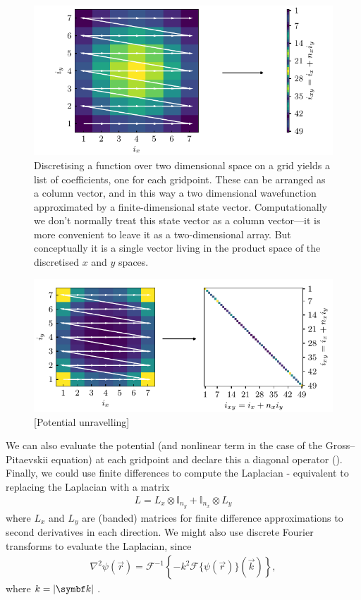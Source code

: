 \begin{figure}[t]
    \centerfloat
    \includegraphics[width=\textwidth]{figures/numerics/vector_unravel.pdf}
    \caption{Discretising a function over two dimensional space on a grid yields a list of coefficients, one for each gridpoint. These can be arranged as a column vector, and in this way a two dimensional wavefunction approximated by a finite-dimensional state vector. Computationally we don't normally treat this state vector as a column vector---it is more convenient to leave it as a two-dimensional array. But conceptually it is a single vector living in the product space of the discretised $x$ and $y$ spaces.}
    \label{fig:vector_unravel}
\end{figure}

\begin{figure}[t]
    \centerfloat
    \includegraphics[width=\textwidth]{figures/numerics/potential_unravel.pdf}
    \caption{[Potential unravelling]}
    \label{fig:potential_unravel}
\end{figure}

We can also evaluate the potential (and nonlinear term in the case of the Gross--Pitaevskii equation) at each gridpoint and declare this a diagonal operator (). Finally, we could use finite differences to compute the Laplacian - equivalent to replacing the Laplacian with a matrix
\begin{align}
L = L_x \otimes \mathbb{I}_{n_y} + \mathbb{I}_{n_x} \otimes L_y 
\end{align} 
where $L_x$ and $L_y$ are (banded) matrices for finite difference approximations to second derivatives in each direction. We might also use discrete Fourier transforms to evaluate the Laplacian, since
\begin{align}
\nabla^2\psi(\vec r) = \mathcal{F}^{-1}\left\{-k^2\mathcal{F}\{\psi(\vec r)\}(\vec k)\right\},
\end{align}
where $ k = \abs{\vec k}$.

